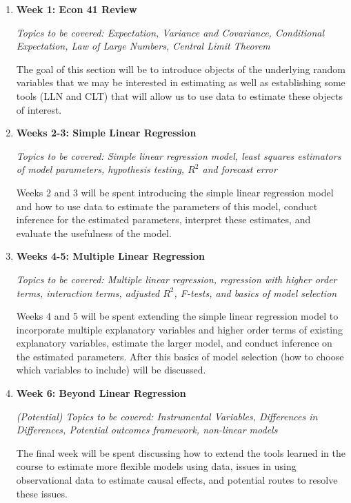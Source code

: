 \documentclass[10pt]{article}
\begin{document}
\begin{enumerate}
  \item {\bf Week 1: Econ 41 Review}

  {\it Topics to be covered: Expectation, Variance and Covariance, Conditional Expectation, Law of Large Numbers, Central Limit Theorem }

  The goal of this section will be to introduce objects of the underlying random variables that we may be interested in estimating as well as establishing some tools (LLN and CLT) that will allow us to use data to estimate these objects of interest.

  \item {\bf Weeks 2-3: Simple Linear Regression}

  {\it Topics to be covered: Simple linear regression model, least squares estimators of model parameters, hypothesis testing, $R^2$ and forecast error}

  Weeks 2 and 3 will be spent introducing the simple linear regression model and how to use data to estimate the parameters of this model, conduct inference for the estimated parameters, interpret these estimates, and evaluate the usefulness of the model.

  \item {\bf Weeks 4-5: Multiple Linear Regression}

  {\it Topics to be covered: Multiple linear regression, regression with higher order terms, interaction terms, adjusted $R^2$, F-tests, and basics of model selection}

  Weeks 4 and 5 will be spent extending the simple linear regression model to incorporate multiple explanatory variables and higher order terms of existing explanatory variables, estimate the larger model, and conduct inference on the estimated parameters. After this basics of model selection (how to choose which variables to include) will be discussed. 

  \item {\bf Week 6: Beyond Linear Regression}

  {\it (Potential) Topics to be covered: Instrumental Variables, Differences in Differences, Potential outcomes framework, non-linear models} 

  The final week will be spent discussing how to extend the tools learned in the course to estimate more flexible models using data, issues in using observational data to estimate causal effects, and potential routes to resolve these issues.
\end{enumerate}
\end{document}
